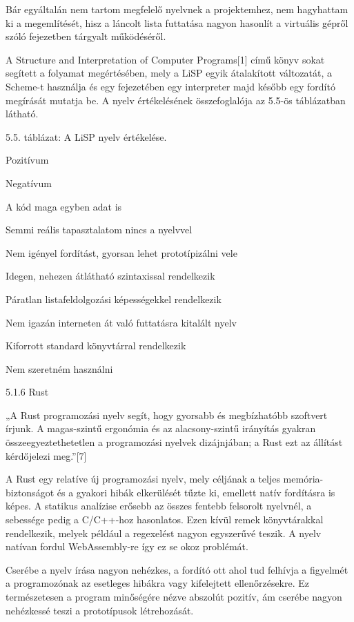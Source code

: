 Bár egyáltalán nem tartom megfelelő nyelvnek a projektemhez, nem hagyhattam ki a megemlítését, hisz a láncolt lista futtatása nagyon hasonlít a virtuális gépről szóló fejezetben tárgyalt működéséről.

A Structure and Interpretation of Computer Programs[1] című könyv sokat segített a folyamat megértésében, mely a LiSP egyik átalakított változatát, a Scheme-t használja és egy fejezetében egy interpreter majd később egy fordító megírását mutatja be. A nyelv értékelésének összefoglalója az 5.5-ös táblázatban látható.

5.5. táblázat: A LiSP nyelv értékelése.

Pozitívum

Negatívum

A kód maga egyben adat is

Semmi reális tapasztalatom nincs a nyelvvel

Nem igényel fordítást, gyorsan lehet prototípizálni vele

Idegen, nehezen átlátható szintaxissal rendelkezik

Páratlan listafeldolgozási képességekkel rendelkezik

Nem igazán interneten át való futtatásra kitalált nyelv

Kiforrott standard könyvtárral rendelkezik

Nem szeretném használni



5.1.6 Rust

„A Rust programozási nyelv segít, hogy gyorsabb és megbízhatóbb szoftvert írjunk. A magas-szintű ergonómia és az alacsony-szintű irányítás gyakran összeegyeztethetetlen a programozási nyelvek dizájnjában; a Rust ezt az állítást kérdőjelezi meg.”[7]

A Rust egy relatíve új programozási nyelv, mely céljának a teljes memória-biztonságot és a gyakori hibák elkerülését tűzte ki, emellett natív fordításra is képes. A statikus analízise erősebb az összes fentebb felsorolt nyelvnél, a sebessége pedig a C/C++-hoz hasonlatos. Ezen kívül remek könyvtárakkal rendelkezik, melyek például a regexelést nagyon egyszerűvé teszik. A nyelv natívan fordul WebAssembly-re így ez se okoz problémát.

Cserébe a nyelv írása nagyon nehézkes, a fordító ott ahol tud felhívja a figyelmét a programozónak az esetleges hibákra vagy kifelejtett ellenőrzésekre. Ez természetesen a program minőségére nézve abszolút pozitív, ám cserébe nagyon nehézkessé teszi a prototípusok létrehozását.

